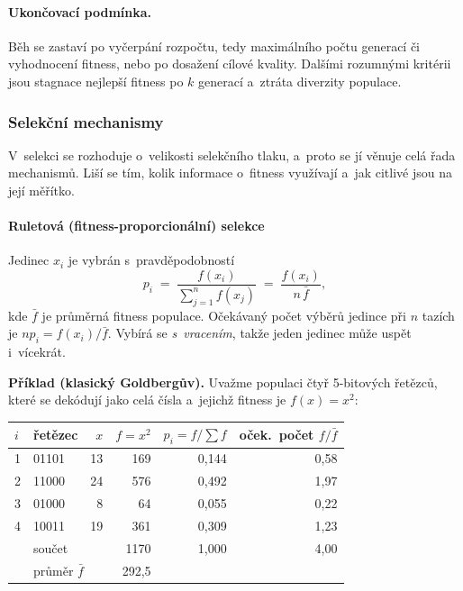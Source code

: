 \documentclass[11pt,a4paper]{article}
\theoremstyle{definition}
\begin{document}
\paragraph{Ukončovací podmínka.} Běh se zastaví po vyčerpání rozpočtu, tedy maximálního
počtu generací či vyhodnocení fitness, nebo po dosažení cílové kvality. Dalšími rozumnými
kritérii jsou stagnace nejlepší fitness po $k$ generací a~ztráta diverzity populace.

\subsubsection{Selekční mechanismy}\label{ssec:selekce}

V~selekci se rozhoduje o~velikosti selekčního tlaku, a~proto se jí věnuje celá řada
mechanismů. Liší se tím, kolik informace o~fitness využívají a~jak citlivé jsou na její
měřítko.

\paragraph{Ruletová (fitness-proporcionální) selekce}

\begin{defbox}
Jedinec $x_i$ je vybrán s~pravděpodobností
\[
p_i \;=\; \frac{f(x_i)}{\sum_{j=1}^{n} f(x_j)} \;=\; \frac{f(x_i)}{n\,\bar{f}},
\]
kde $\bar f$ je průměrná fitness populace. Očekávaný počet výběrů jedince při
$n$ tazích je $n p_i = f(x_i)/\bar f$. Vybírá se \emph{s~vracením}, takže jeden
jedinec může uspět i~vícekrát.
\end{defbox}

\textbf{Příklad (klasický Goldbergův).}\label{ex:goldberg} Uvažme populaci čtyř
5-bitových řetězců, které se dekódují jako celá čísla a~jejichž fitness je $f(x) = x^2$:

\begin{center}
\begin{tabular}{@{}llrrrr@{}}
\toprule
$i$ & řetězec & $x$ & $f=x^2$ & $p_i = f/\sum f$ & oček.\ počet $f/\bar f$ \\
\midrule
1 & 01101 & 13 & 169 & 0{,}144 & 0{,}58 \\
2 & 11000 & 24 & 576 & 0{,}492 & 1{,}97 \\
3 & 01000 &  8 &  64 & 0{,}055 & 0{,}22 \\
4 & 10011 & 19 & 361 & 0{,}309 & 1{,}23 \\
\midrule
  & \multicolumn{2}{l}{součet} & 1170 & 1{,}000 & 4{,}00 \\
  & \multicolumn{2}{l}{průměr $\bar f$} & 292{,}5 & & \\
\bottomrule
\end{tabular}
\end{center}
\end{document}
